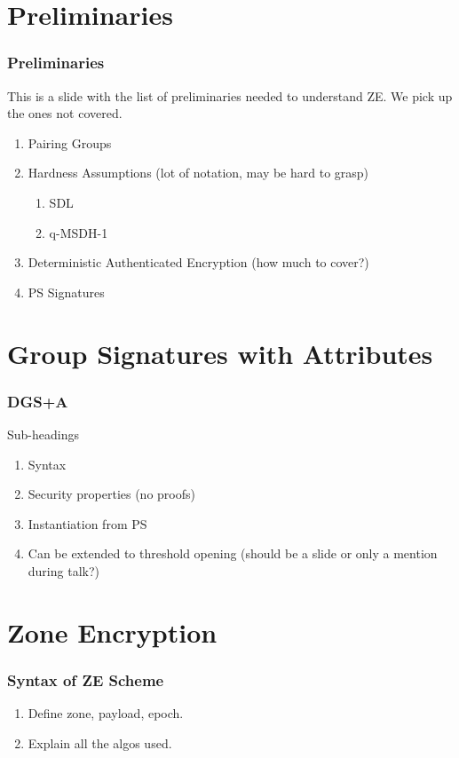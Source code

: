 \documentclass{beamer}
\begin{document}
    \section{Preliminaries}
    \begin{frame}
        \frametitle{Preliminaries}
        This is a slide with the list of preliminaries needed to understand ZE.
        We pick up the ones not covered.
        \begin{enumerate}
            \item Pairing Groups
            \item Hardness Assumptions (lot of notation, may be hard to grasp)
            \begin{enumerate}
                \item SDL
                \item q-MSDH-1
            \end{enumerate}
            \item Deterministic Authenticated Encryption (how much to cover?)
            \item PS Signatures
        \end{enumerate}
    \end{frame}

    \section{Group Signatures with Attributes}
    \begin{frame}
        \frametitle{DGS+A}
        Sub-headings
        \begin{enumerate}
            \item Syntax
            \item Security properties (no proofs)
            \item Instantiation from PS
            \item Can be extended to threshold opening (should be a slide or
            only a mention during talk?)
        \end{enumerate}
    \end{frame}

    \section{Zone Encryption}
    
    \begin{frame}
        \frametitle{Syntax of ZE Scheme}
        \begin{enumerate}
            \item Define zone, payload, epoch.
            \item Explain all the algos used.
        \end{enumerate}
    \end{frame}
\end{document}
